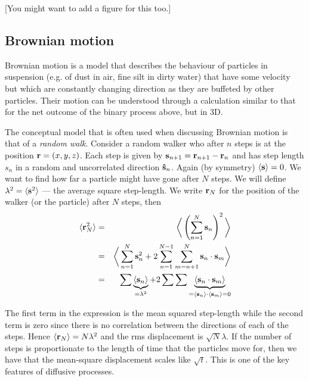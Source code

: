 [You might want to add a figure for this too.]

\subsection{Brownian motion}
Brownian motion is a model that describes the behaviour of particles in suspension (e.g. of dust in air, fine silt in dirty water) that have some velocity but which are constantly changing direction as they are buffeted by other particles. Their motion can be understood through a calculation similar to that for the net outcome of the binary process above, but in 3D.

The conceptual model that is often used when discussing Brownian motion is that of a \emph{random walk}. Consider a random walker who after $n$ steps is at the position ${\bf r} = (x,y,z)$. Each step is given by ${\bf s}_{n+1} = {\bf r}_{n+1}- {\bf r}_n$ and has step length $s_n$ in a random and uncorrelated direction ${\bf\hat{s}}_n$. Again (by symmetry) $\langle {\bf s}\rangle =0$. We want to find how far a particle might have gone after $N$ steps. We will define $\lambda^2= \langle {\bf s}^2\rangle$ --- the average square step-length. We write ${\bf r}_N$ for the position of the walker (or the particle) after $N$ steps, then
\begin{eqnarray*}
	\langle {\bf r}_N^2 \rangle &=& \bigg\langle \left(\sum_{n=1}^N{\bf s}_n\right)^2 \bigg\rangle\\
		&=& \bigg\langle \sum_{n=1}^N{\bf s}_n^2 +2\sum_{n=1}^{N-1}\sum_{m=n+1}^N{\bf s}_n\cdot{\bf s}_m \bigg\rangle\\
		&=& \sum\underbrace{\langle {\bf s}_n\rangle}_{=\lambda^2} + 2\sum\sum \underbrace{\langle {\bf s}_n \cdot {\bf s}_m \rangle}_{=\langle {\bf s}_n\rangle \cdot \langle{\bf s}_m \rangle=0}
\end{eqnarray*}

The first term in the expression is the mean squared step-length while the second term is zero since there is no correlation between the directions of each of the steps. Hence $\langle {\bf r}_N\rangle = N\lambda^2$ and the rms displacement is $\sqrt{N}\lambda$. If the number of steps is proportionate to the length of time that the particles move for, then we have that the mean-square displacement scales like $\sqrt{t}$. This is one of the key features of diffusive processes. 




